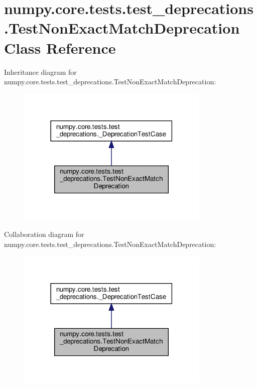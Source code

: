 \hypertarget{classnumpy_1_1core_1_1tests_1_1test__deprecations_1_1TestNonExactMatchDeprecation}{}\section{numpy.\+core.\+tests.\+test\+\_\+deprecations.\+Test\+Non\+Exact\+Match\+Deprecation Class Reference}
\label{classnumpy_1_1core_1_1tests_1_1test__deprecations_1_1TestNonExactMatchDeprecation}


Inheritance diagram for numpy.\+core.\+tests.\+test\+\_\+deprecations.\+Test\+Non\+Exact\+Match\+Deprecation\+:
\nopagebreak
\begin{figure}[H]
\begin{center}
\leavevmode
\includegraphics[width=261pt]{classnumpy_1_1core_1_1tests_1_1test__deprecations_1_1TestNonExactMatchDeprecation__inherit__graph}
\end{center}
\end{figure}


Collaboration diagram for numpy.\+core.\+tests.\+test\+\_\+deprecations.\+Test\+Non\+Exact\+Match\+Deprecation\+:
\nopagebreak
\begin{figure}[H]
\begin{center}
\leavevmode
\includegraphics[width=261pt]{classnumpy_1_1core_1_1tests_1_1test__deprecations_1_1TestNonExactMatchDeprecation__coll__graph}
\end{center}
\end{figure}
